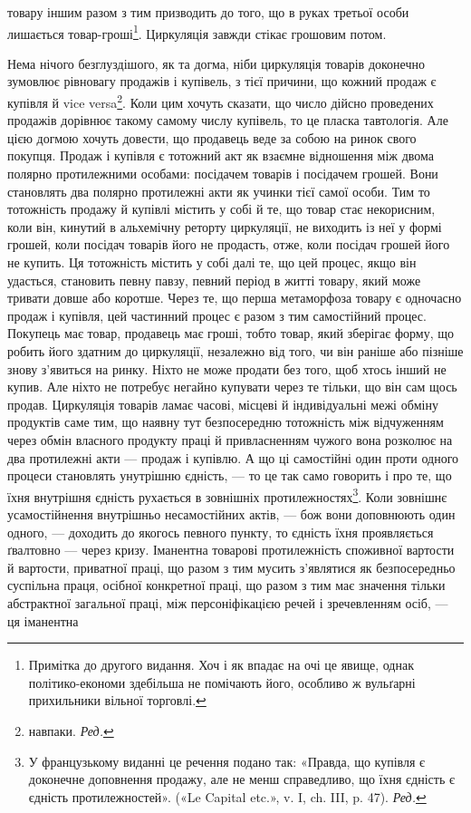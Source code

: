 \parcont{}  %
товару іншим разом з тим призводить до того, що в руках третьої
особи лишається товар-гроші\footnote{
Примітка до другого видання. Хоч і як впадає на очі це явище,
однак політико-економи здебільша не помічають його, особливо ж вульґарні
прихильники вільної торговлі.
}. Циркуляція завжди стікає грошовим
потом.

Нема нічого безглуздішого, як та догма, ніби циркуляція
товарів доконечно зумовлює рівновагу продажів і купівель, з
тієї причини, що кожний продаж є купівля й vice versa\footnote*{
навпаки. \emph{Ред.}
}. Коли
цим хочуть сказати, що число дійсно проведених продажів дорівнює
такому самому числу купівель, то це пласка тавтологія.
Але цією догмою хочуть довести, що продавець веде за собою
на ринок свого покупця. Продаж і купівля є тотожний акт як
взаємне відношення між двома полярно протилежними особами:
посідачем товарів і посідачем грошей. Вони становлять два полярно
протилежні акти як учинки тієї самої особи. Тим то тотожність
продажу й купівлі містить у собі й те, що товар стає некорисним,
коли він, кинутий в альхемічну реторту циркуляції, не
виходить із неї у формі грошей, коли посідач товарів його не продасть,
отже, коли посідач грошей його не купить. Ця тотожність
містить у собі далі те, що цей процес, якщо він удасться, становить
певну павзу, певний період в житті товару, який може тривати
довше або коротше. Через те, що перша метаморфоза товару є
одночасно продаж і купівля, цей частинний процес є разом з
тим самостійний процес. Покупець має товар, продавець має
гроші, тобто товар, який зберігає форму, що робить його здатним
до циркуляції, незалежно від того, чи він раніше або пізніше
знову з’явиться на ринку. Ніхто не може продати без того, щоб
хтось інший не купив. Але ніхто не потребує негайно купувати
через те тільки, що він сам щось продав. Циркуляція товарів
ламає часові, місцеві й індивідуальні межі обміну продуктів
саме тим, що наявну тут безпосередню тотожність між відчуженням
через обмін власного продукту праці й привласненням
чужого вона розколює на два протилежні акти — продаж і купівлю.
А що ці самостійні один проти одного процеси становлять
унутрішню єдність, — то це так само говорить і про те, що їхня
внутрішня єдність рухається в зовнішніх протилежностях\footnote*{
У французькому виданні це речення подано так: «Правда, що купівля
є доконечне доповнення продажу, але не менш справедливо, що
їхня єдність є єдність протилежностей». («Le Capital etc.», v. I, ch. III, p. 47).
\emph{Ред.}
}.
Коли зовнішнє усамостійнення внутрішньо несамостійних актів, —
бож вони доповнюють один одного, — доходить до якогось певного
пункту, то єдність їхня проявляється ґвалтовно — через
кризу. Іманентна товарові протилежність споживної вартости й
вартости, приватної праці, що разом з тим мусить з’являтися
як безпосередньо суспільна праця, осібної конкретної праці,
що разом з тим має значення тільки абстрактної загальної праці,
між персоніфікацією речей і зречевленням осіб, — ця іманентна
\parbreak{}  %
